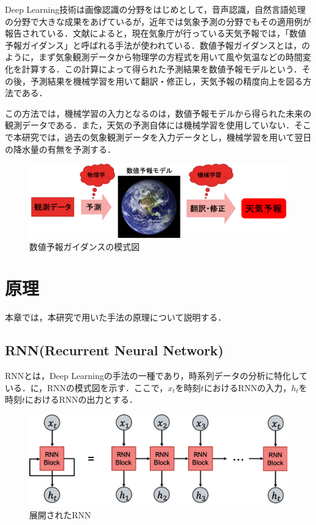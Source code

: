 \documentclass{eithesis}
\begin{document}
	Deep Learning技術は画像認識の分野をはじめとして，音声認識，自然言語処理の分野で大きな成果をあげているが，近年では気象予測の分野でもその適用例が報告されている．文献\cite{kishow}によると，現在気象庁が行っている天気予報では，「数値予報ガイダンス」と呼ばれる手法が使われている．数値予報ガイダンスとは，のように，まず気象観測データから物理学の方程式を用いて風や気温などの時間変化を計算する．この計算によって得られた予測結果を数値予報モデルという．その後，予測結果を機械学習を用いて翻訳・修正し，天気予報の精度向上を図る方法である．

	この方法では，機械学習の入力となるのは，数値予報モデルから得られた未来の観測データである．また，天気の予測自体には機械学習を使用していない．そこで本研究では，過去の気象観測データを入力データとし，機械学習を用いて翌日の降水量の有無を予測する．
	\begin{figure}[htbp]
		\centering
		\includegraphics[width=14cm]{./images/guidance.png}
		\caption{数値予報ガイダンスの模式図}
		\label{fig_guidance}
	\end{figure}
	\clearpage

\chapter{原理}
	本章では，本研究で用いた手法の原理について説明する．

	\section{RNN(Recurrent Neural Network)}
		RNNとは，Deep Learningの手法の一種であり，時系列データの分析に特化している．に，RNNの模式図を示す．ここで，$x_t$を時刻$t$におけるRNNの入力，$h_t$を時刻$t$におけるRNNの出力とする．
		\begin{figure}[htbp]
			\centering
			\includegraphics[width=14cm]{./images/RNN.png}
			\caption{展開されたRNN}
			\label{fig_RNN}
		\end{figure}
\end{document}
